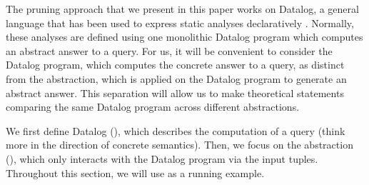 
The pruning approach that we present in this paper works on Datalog, a general
language that has been used to express static analyses declaratively \cite{Whaley2007,bravenboer}.  Normally,
these analyses are defined using one monolithic Datalog program which
computes an abstract answer to a query.
For us, it will be convenient to consider the Datalog program, which computes the concrete answer to a query,
as distinct from the abstraction, which is applied on the Datalog program to generate an abstract answer.
This separation will allow us to make theoretical
statements comparing the same Datalog program across different
abstractions.

We first define Datalog (), which describes the
computation of a query (think more in the direction of concrete semantics).
Then, we focus on the abstraction (), which only interacts
with the Datalog program via the input tuples.
Throughout this section, we will use  as a running example.

